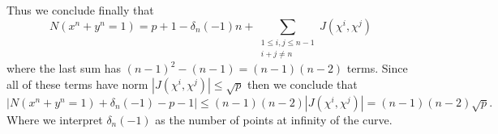 Thus we conclude finally that 
\[
   N(x^n + y^n = 1) = p+1-\delta_n(-1)n 
   + \sum_{\substack{1 \leqslant i, j \leqslant n-1 \\ i + j \neq  n}} J(\chi^i,
   \chi^j)
\] 
where the last sum has \((n-1)^2 - (n-1)  = (n-1)(n-2)\) terms. Since all of
these terms have norm \(|J(\chi^i, \chi^j)| \leqslant \sqrt{p}\) then we
conclude that
\[
   |N(x^n + y^n = 1) + \delta_n(-1) -p -1| \leqslant (n-1)(n-2) |J(\chi^i,
   \chi^j)| = (n-1)(n-2)\sqrt{p}.
\] 
Where we interpret \(\delta_n(-1)\) as the number of points at infinity of the
curve.
